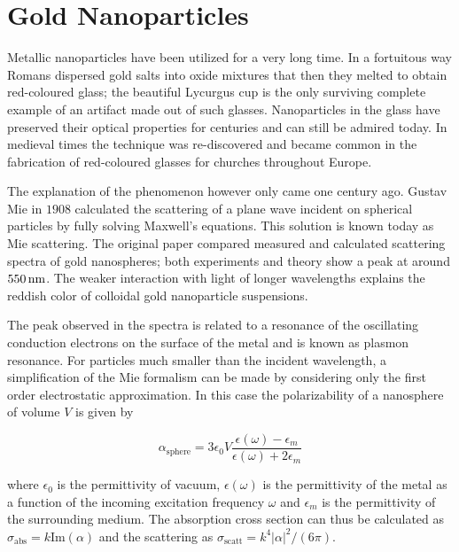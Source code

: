 \section{Gold Nanoparticles}
Metallic nanoparticles have been utilized for a very long time. In a fortuitous
way Romans dispersed gold salts into oxide mixtures that then they melted to
obtain red-coloured glass; the beautiful Lycurgus
cup\cite{barber1990investigation} is the only surviving complete example of an
artifact made out of such glasses. Nanoparticles in the glass have preserved
their optical properties for centuries and can still be admired today. In
medieval times the technique was re-discovered and became common in the
fabrication of red-coloured glasses for churches throughout Europe. 

The explanation of the phenomenon however only came one century ago. Gustav Mie
in $1908$ calculated the scattering of a plane wave incident on spherical
particles\cite{mie1908beitrage} by fully solving Maxwell's equations.
This solution is known today as Mie scattering. The original paper compared
measured and calculated scattering spectra of gold nanospheres; both experiments
and theory show a peak at around $550\,\textrm{nm}$. The weaker interaction with light of
longer wavelengths explains the reddish color of colloidal gold nanoparticle
suspensions.

The peak observed in the spectra is related to a resonance of the oscillating
conduction electrons on the surface of the metal and is known as plasmon
resonance. For particles much smaller than the incident wavelength, a
simplification of the Mie formalism can be made by considering only the first
order electrostatic approximation. In this case the polarizability of a
nanosphere of volume $V$ is given by\cite{bohren2008absorption}

\begin{equation}\label{eqn:polarizability}
	\alpha_{\textrm{sphere}} =
	3\epsilon_0V\frac{\epsilon(\omega)-\epsilon_m}{\epsilon(\omega)+2\epsilon_m}
\end{equation}

\noindent where $\epsilon_0$ is the permittivity of vacuum, $\epsilon(\omega)$
is the permittivity of the metal as a function of the incoming excitation
frequency $\omega$ and $\epsilon_m$ is the permittivity of the surrounding medium. The absorption
cross section can thus be calculated as
$\sigma_\textrm{abs}=k\textrm{Im}(\alpha)$ and the scattering as
$\sigma_\textrm{scatt}=k^4|\alpha|^2/(6\pi)$.


